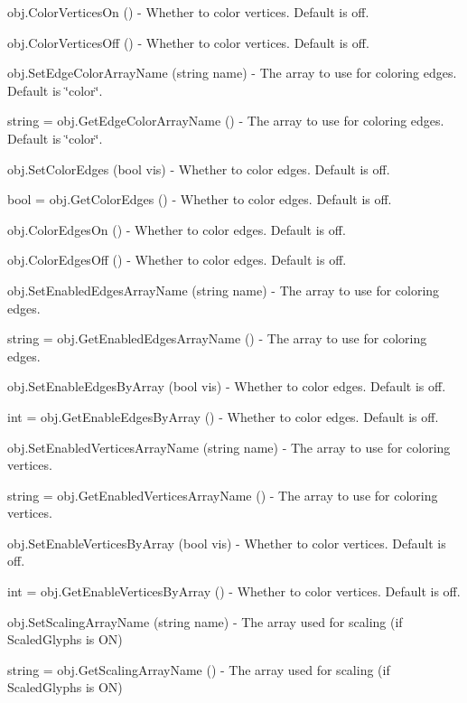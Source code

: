 \begin{DoxyItemize}
\item {\ttfamily obj.\-Color\-Vertices\-On ()} -\/ Whether to color vertices. Default is off.  
\item {\ttfamily obj.\-Color\-Vertices\-Off ()} -\/ Whether to color vertices. Default is off.  
\item {\ttfamily obj.\-Set\-Edge\-Color\-Array\-Name (string name)} -\/ The array to use for coloring edges. Default is \char`\"{}color\char`\"{}.  
\item {\ttfamily string = obj.\-Get\-Edge\-Color\-Array\-Name ()} -\/ The array to use for coloring edges. Default is \char`\"{}color\char`\"{}.  
\item {\ttfamily obj.\-Set\-Color\-Edges (bool vis)} -\/ Whether to color edges. Default is off.  
\item {\ttfamily bool = obj.\-Get\-Color\-Edges ()} -\/ Whether to color edges. Default is off.  
\item {\ttfamily obj.\-Color\-Edges\-On ()} -\/ Whether to color edges. Default is off.  
\item {\ttfamily obj.\-Color\-Edges\-Off ()} -\/ Whether to color edges. Default is off.  
\item {\ttfamily obj.\-Set\-Enabled\-Edges\-Array\-Name (string name)} -\/ The array to use for coloring edges.  
\item {\ttfamily string = obj.\-Get\-Enabled\-Edges\-Array\-Name ()} -\/ The array to use for coloring edges.  
\item {\ttfamily obj.\-Set\-Enable\-Edges\-By\-Array (bool vis)} -\/ Whether to color edges. Default is off.  
\item {\ttfamily int = obj.\-Get\-Enable\-Edges\-By\-Array ()} -\/ Whether to color edges. Default is off.  
\item {\ttfamily obj.\-Set\-Enabled\-Vertices\-Array\-Name (string name)} -\/ The array to use for coloring vertices.  
\item {\ttfamily string = obj.\-Get\-Enabled\-Vertices\-Array\-Name ()} -\/ The array to use for coloring vertices.  
\item {\ttfamily obj.\-Set\-Enable\-Vertices\-By\-Array (bool vis)} -\/ Whether to color vertices. Default is off.  
\item {\ttfamily int = obj.\-Get\-Enable\-Vertices\-By\-Array ()} -\/ Whether to color vertices. Default is off.  
\item {\ttfamily obj.\-Set\-Scaling\-Array\-Name (string name)} -\/ The array used for scaling (if Scaled\-Glyphs is O\-N)  
\item {\ttfamily string = obj.\-Get\-Scaling\-Array\-Name ()} -\/ The array used for scaling (if Scaled\-Glyphs is O\-N)  

\end{DoxyItemize}

